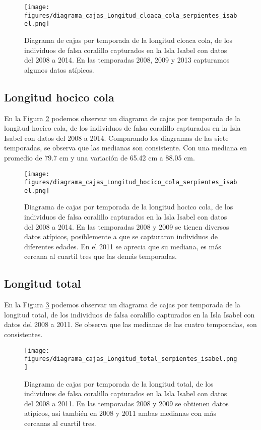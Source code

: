 \documentclass{article}
\begin{document}
\begin{figure}[H]
\centering
\label{fig:pngBoxsplotLongitudCloacaCola}
\texttt{[image: figures/diagrama\_cajas\_Longitud\_cloaca\_cola\_serpientes\_isabel.png]}
\caption{Diagrama de cajas por temporada de la longitud cloaca cola, de los individuos de falsa coralillo capturados en la Isla Isabel con datos del 2008 a 2014. En las temporadas 2008, 2009 y 2013 capturamos algunos datos atípicos.}
\end{figure}

\subsection*{Longitud hocico cola}
En la Figura \ref{fig:pngBoxsplotLongitudHocicoCola} podemos observar un diagrama de cajas por
temporada de la longitud hocico cola, de los individuos de falsa coralillo capturados en la Isla
Isabel con datos del 2008 a 2014. Comparando los diagramas de las siete temporadas, se observa  que
las medianas son consistente. Con una mediana en promedio de 79.7 cm y una variación de 65.42 cm a
88.05 cm. 

\begin{figure}[H]
\centering
\label{fig:pngBoxsplotLongitudHocicoCola}
\texttt{[image: figures/diagrama\_cajas\_Longitud\_hocico\_cola\_serpientes\_isabel.png]}
\caption{Diagrama de cajas por temporada de la longitud hocico cola, de los individuos de falsa coralillo capturados en la Isla Isabel con datos del 2008 a 2014. En las temporadas 2008 y 2009 se tienen diversos datos atípicos, posiblemente a que se capturaron individuos de diferentes edades. En el 2011 se aprecia que su mediana, es más cercana al cuartil tres que las demás temporadas.}
\end{figure}

\subsection*{Longitud total}
En la Figura \ref{fig:pngBoxsplotLongitudTotal} podemos observar un diagrama de cajas por temporada
de la longitud total, de los individuos de falsa coralillo capturados en la Isla Isabel con datos
del 2008 a 2011. Se observa que las medianas de las cuatro temporadas, son consistentes.  

\begin{figure}[H]
\centering
\label{fig:pngBoxsplotLongitudTotal}
\texttt{[image: figures/diagrama\_cajas\_Longitud\_total\_serpientes\_isabel.png]}
\caption{Diagrama de cajas por temporada de la longitud total, de los individuos de falsa coralillo capturados en la Isla Isabel con datos del 2008 a 2011. En las temporadas 2008 y 2009 se obtienen datos atípicos, así también en 2008 y 2011 ambas medianas con más cercanas al cuartil tres.}
\end{figure}
\end{document}
